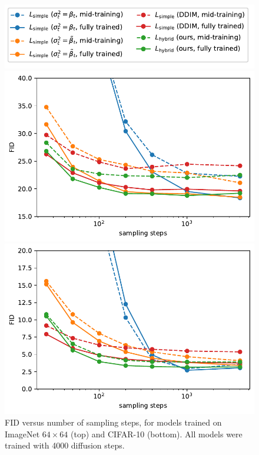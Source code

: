 \documentclass{article}
\begin{document}
\begin{figure}[t]
\begin{center}
\centerline{\includegraphics[width=0.8\columnwidth]{fid_vs_steps_cifar_legend-eps.pdf}}
\centerline{\includegraphics[width=0.8\columnwidth]{fid_vs_steps-eps.pdf}}
\centerline{\includegraphics[width=0.8\columnwidth]{fid_vs_steps_cifar-eps.pdf}}
\caption{\label{fig:fidvssteps} FID versus number of sampling steps, for models trained on ImageNet $64 \times 64$ (top) and CIFAR-10 (bottom). All models were trained with 4000 diffusion steps.}
\end{center}
\vskip -0.4in
\end{figure}
\end{document}
